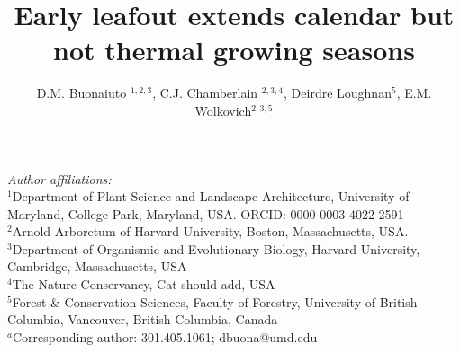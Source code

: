\documentclass{article}[12pt]
\title{Early leafout extends calendar but not thermal growing seasons} %
\author{D.M. Buonaiuto $^{1,2,3}$, C.J. Chamberlain $^{2,3,4}$,
Deirdre Loughnan$^{5}$, E.M. Wolkovich$^{2,3,5}$}
\begin{document}

\maketitle

\noindent \emph{Author affiliations:}\\
\noindent $^1$Department of Plant Science and Landscape Architecture, University of Maryland, College Park, Maryland, USA. ORCID: 0000-0003-4022-2591\\
\noindent $^2$Arnold Arboretum of Harvard University, Boston, Massachusetts, USA.\\
$^3$Department of Organismic and Evolutionary Biology, Harvard University, Cambridge, Massachusetts, USA \\
$^4$The Nature Conservancy, Cat should add, USA \\
$^5$Forest \& Conservation Sciences, Faculty of Forestry, University of British Columbia, Vancouver, British Columbia, Canada\\
$^a$Corresponding author: 301.405.1061; dbuona@umd.edu\\




\setlength{\parindent}{0pt}






\end{document}

